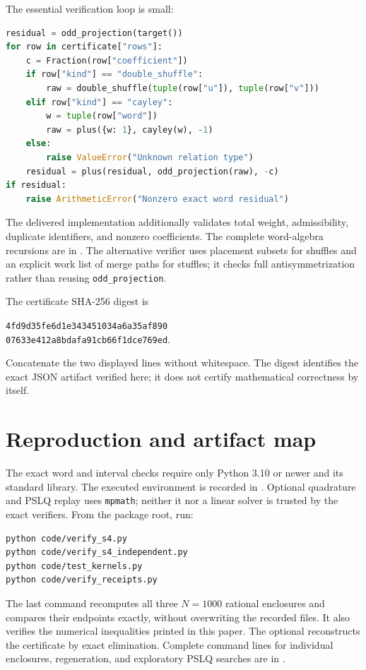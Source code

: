 \documentclass[11pt,letterpaper]{article}
\numberwithin{equation}{section}
\theoremstyle{definition}
\begin{document}
The essential verification loop is small:
\begin{lstlisting}[language=Python]
residual = odd_projection(target())
for row in certificate["rows"]:
    c = Fraction(row["coefficient"])
    if row["kind"] == "double_shuffle":
        raw = double_shuffle(tuple(row["u"]), tuple(row["v"]))
    elif row["kind"] == "cayley":
        w = tuple(row["word"])
        raw = plus({w: 1}, cayley(w), -1)
    else:
        raise ValueError("Unknown relation type")
    residual = plus(residual, odd_projection(raw), -c)
if residual:
    raise ArithmeticError("Nonzero exact word residual")
\end{lstlisting}
The delivered implementation additionally validates total weight,
admissibility, duplicate identifiers, and nonzero coefficients. The
complete word-algebra recursions are in .
The alternative verifier uses placement subsets for shuffles and an
explicit work list of merge paths for stuffles; it checks full
antisymmetrization rather than reusing \texttt{odd\_projection}.

The certificate SHA-256 digest is
\begin{center}\small
\texttt{4fd9d35fe6d1e343451034a6a35af890}\\
\texttt{07633e412a8bdafa91cb66f1dce769ed}.
\end{center}
Concatenate the two displayed lines without whitespace. The digest
identifies the exact JSON artifact verified here; it does not certify
mathematical correctness by itself.

\section{Reproduction and artifact map}
\label{app:repro}

The exact word and interval checks require only Python 3.10 or newer and
its standard library. The executed environment is recorded in
. Optional quadrature and PSLQ replay uses
\texttt{mpmath}; neither it nor a linear solver is trusted by the exact
verifiers. From the package root, run:
\begin{lstlisting}
python code/verify_s4.py
python code/verify_s4_independent.py
python code/test_kernels.py
python code/verify_receipts.py
\end{lstlisting}
The last command recomputes all three $N=1000$ rational enclosures and
compares their endpoints exactly, without overwriting the recorded files.
It also verifies the numerical inequalities printed in this paper.
The optional  reconstructs the certificate
by exact elimination. Complete command lines for individual enclosures,
regeneration, and exploratory PSLQ searches are in .
\end{document}
